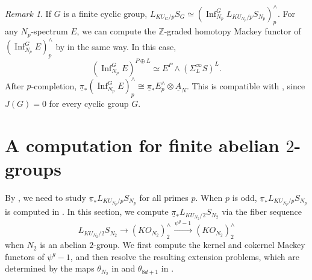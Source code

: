 \documentclass{amsart}
\theoremstyle{plain}
\theoremstyle{definition}
\theoremstyle{remark}
\newtheorem{remark}[theorem]{Remark}
\begin{document}
\begin{remark}
    If $G$ is a finite cyclic group, $L_{KU_G/p}S_G\simeq (\operatorname{Inf}_{N_p}^G L_{KU_{N_p}/p}S_{N_p})_p^\wedge$. For any $N_p$-spectrum $E$, we can compute the $\mathbb{Z}$-graded homotopy Mackey functor of $(\operatorname{Inf}_{N_p}^G E)_p^\wedge$ by  in the same way. In this case, 
    \[ (\operatorname{Inf}_{N_p}^G E)^{P\oplus L}\simeq E^P \wedge (\Sigma_L^\infty S)^L. \]
    After $p$-completion, $\underline{\pi}_* (\operatorname{Inf}_{N_p}^G E)_p^\wedge\cong \underline{\pi}_* E_p^\wedge \otimes \underline{A}_N$. This is compatible with , since $J(G)=0$ for every cyclic group $G$.
\end{remark}


\section{A computation for finite abelian $2$-groups}\label{Sec:computation for 2-group}
By , we need to study $\underline{\pi}_* L_{KU_{N_p}/p}S_{N_p}$ for all primes $p$. When $p$ is odd, $\underline{\pi}_*L_{KU_{N_p}/p}S_{N_p}$ is computed in \cite{carawan2023homotopy}. In this section, we compute $\underline{\pi}_*L_{KU_{N_2}/2}S_{N_2}$ via the fiber sequence
\[
L_{KU_{N_2}/2}S_{N_2} \to (KO_{N_2})_2^\wedge \xrightarrow{\ \psi^g-1\ } (KO_{N_2})_2^\wedge
\]
when $N_2$ is an abelian $2$-group. We first compute the kernel and cokernel Mackey functors of \(\psi^g-1\), and then resolve the resulting extension problems, which are determined by the maps \(\theta_{N_2}\) in  and \(\theta_{8d+1}\) in .
\end{document}
